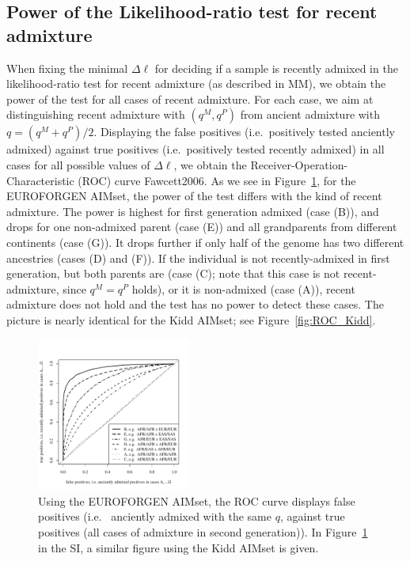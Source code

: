 \documentclass[12pt]{article}
\theoremstyle{definition}
\begin{document}
\subsection{Power of the Likelihood-ratio test for recent admixture}
When fixing the minimal $\Delta\ell$  for deciding if a sample is recently admixed in the likelihood-ratio test for recent admixture (as described in MM), we obtain the power of the test for all cases of recent admixture. {\color{blue}For each case, we aim at distinguishing recent admixture with $(q^M, q^P)$ from ancient admixture with $q = (q^M+q^P)/2$. Displaying the false positives (i.e.\ positively tested anciently admixed) against true positives (i.e.\ positively tested recently admixed) in all cases for all possible values of $\Delta\ell$, we obtain the Receiver-Operation-Characteristic (ROC) curve \cite{article}{Fawcett2006}. }
As we see in Figure~\ref{fig:ROC_EUROFORGEN}, for the EUROFORGEN AIMset, the power of the test differs with the kind of {\color{blue} recent} admixture.  {\color{blue}The power is highest for first generation admixed (case (B)), and drops for one non-admixed parent (case (E)) and all grandparents from different continents (case (G)). It drops further if only half of the genome has two different ancestries (cases (D) and (F)). If the individual is not recently-admixed in first generation, but both parents are (case (C); note that this case is not recent-admixture, since $q^M = q^P$ holds), or it is non-admixed (case (A)), recent admixture does not hold and the test has no power to detect these cases.} The picture is nearly identical for the Kidd AIMset; see Figure~\ref{fig:ROC_Kidd}.

\begin{figure}[htb]
  \begin{center}
    \includegraphics[width=0.45\textwidth]{roc-curve-EUROFORGEN.pdf}
  \end{center}
      \caption{Using the EUROFORGEN AIMset, the ROC curve displays false positives (i.e.\ {\color{blue} anciently admixed with the same $q$,} against true positives (all cases of admixture in second generation)). In Figure~\ref{fig:ROC_EUROFORGEN} in the SI, a similar figure using the Kidd AIMset is given.}
  \label{fig:ROC_EUROFORGEN}
\end{figure}
\end{document}
